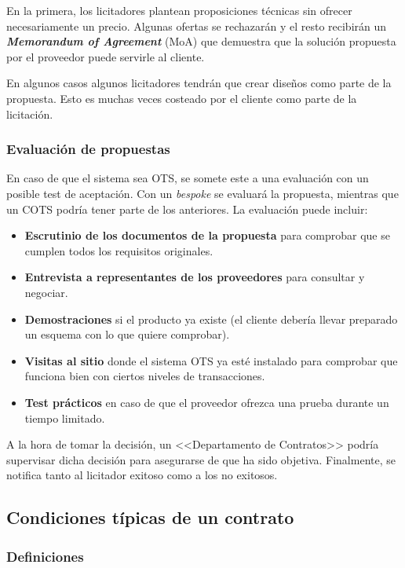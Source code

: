 \documentclass[12pt]{article}
\begin{document}
{En la primera, los licitadores plantean proposiciones técnicas sin ofrecer necesariamente un precio. Algunas ofertas se rechazarán y el resto recibirán un \textbf{\textit{Memorandum of Agreement}} (MoA) que demuestra que la solución propuesta por el proveedor puede servirle al cliente.} \bigskip

{En algunos casos algunos licitadores tendrán que crear diseños como parte de la propuesta. Esto es muchas veces costeado por el cliente como parte de la licitación.}

\subsubsection{Evaluación de propuestas}
\label{10.3.4}

{En caso de que el sistema sea OTS, se somete este a una evaluación con un posible test de aceptación. Con un \textit{bespoke} se evaluará la propuesta, mientras que un COTS podría tener parte de los anteriores. La evaluación puede incluir:}

\begin{itemize}
    \item {\textbf{Escrutinio de los documentos de la propuesta} para comprobar que se cumplen todos los requisitos originales.}
    \item {\textbf{Entrevista a representantes de los proveedores} para consultar y negociar.}
    \item {\textbf{Demostraciones} si el producto ya existe (el cliente debería llevar preparado un esquema con lo que quiere comprobar).}
    \item {\textbf{Visitas al sitio} donde el sistema OTS ya esté instalado para comprobar que funciona bien con ciertos niveles de transacciones.}
    \item {\textbf{Test prácticos} en caso de que el proveedor ofrezca una prueba durante un tiempo limitado.}
\end{itemize}

{A la hora de tomar la decisión, un <<Departamento de Contratos>> podría supervisar dicha decisión para asegurarse de que ha sido objetiva. Finalmente, se notifica tanto al licitador exitoso como a los no exitosos.}

\subsection{Condiciones típicas de un contrato}
\label{10.4.0}

\subsubsection{Definiciones}
\label{10.4.1}
\end{document}
